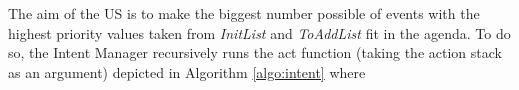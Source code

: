 				The aim of the US is to make the biggest number possible of events with the highest priority values taken from \textit{InitList} and \textit{ToAddList} fit in the agenda. To do so, the Intent Manager recursively runs the act function (taking the action stack as an argument) depicted in Algorithm \ref{algo:intent} where
        
        
			
